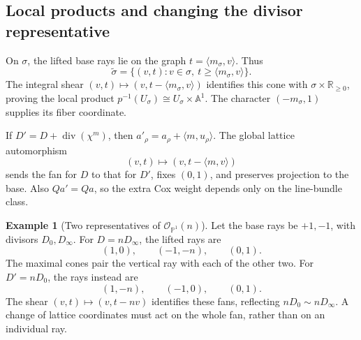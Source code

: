 \documentclass[11pt]{article}
\theoremstyle{definition}
\newtheorem{Ex}{Example}
\theoremstyle{remark}
\DeclareMathOperator{\divisor}{div}
\newcommand{\A}{\mathbb A}
\newcommand{\Pj}{\mathbb P}
\newcommand{\R}{\mathbb R}
\newcommand{\OO}{\mathcal O}
\begin{document}
\subsection{Local products and changing the divisor representative}

On \(\sigma\), the lifted base rays lie on the graph
\(t=\langle m_\sigma,v\rangle\). Thus
\[
\widetilde\sigma
=\{(v,t):v\in\sigma,\ t\geq\langle m_\sigma,v\rangle\}.
\]
The integral shear
\((v,t)\mapsto(v,t-\langle m_\sigma,v\rangle)\) identifies this
cone with \(\sigma\times\R_{\geq0}\), proving the local product
\(p^{-1}(U_\sigma)\cong U_\sigma\times\A^1\).
The character \((-m_\sigma,1)\) supplies its fiber coordinate.

If \(D'=D+\divisor(\chi^m)\), then
\(a'_\rho=a_\rho+\langle m,u_\rho\rangle\). The global lattice
automorphism
\[
(v,t)\longmapsto(v,t-\langle m,v\rangle)
\]
sends the fan for \(D\) to that for \(D'\), fixes \((0,1)\), and
preserves projection to the base. Also \(Qa'=Qa\), so the extra Cox
weight depends only on the line-bundle class.

\begin{Ex}[Two representatives of \(\OO_{\Pj^1}(n)\)]
Let the base rays be \(+1,-1\), with divisors \(D_0,D_\infty\).
For \(D=nD_\infty\), the lifted rays are
\[
(1,0),\qquad(-1,-n),\qquad(0,1).
\]
The maximal cones pair the vertical ray with each of the other two.
For \(D'=nD_0\), the rays instead are
\[
(1,-n),\qquad(-1,0),\qquad(0,1).
\]
The shear \((v,t)\mapsto(v,t-nv)\) identifies these fans, reflecting
\(nD_0\sim nD_\infty\). A change of lattice coordinates must act on
the whole fan, rather than on an individual ray.
\end{Ex}
\end{document}
